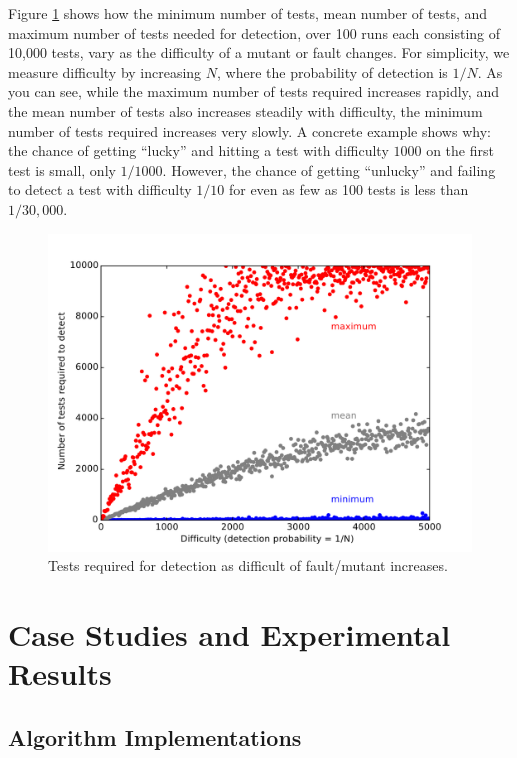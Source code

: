 \documentclass{svjour3}
\begin{document}
Figure \ref{fig:probmodel} shows how the minimum number of tests, mean
number of tests, and maximum number of tests needed for detection,
over 100 runs each consisting of 10,000 tests, vary as the difficulty
of a mutant or fault changes.  For simplicity, we measure difficulty
by increasing $N$, where the probability of detection is $1/N$.  As
you can see, while the maximum number of tests required increases
rapidly, and the mean number of tests also increases steadily with
difficulty, the minimum number of tests required increases very
slowly.  A concrete example shows why: the chance of getting ``lucky'' and hitting a test with
difficulty $1000$ on the first test is small, only $1/1000$.  However, the
chance of getting ``unlucky'' and failing to detect a test with
difficulty $1/10$ for even as few as 100 tests is less than $1/30,000$.

\begin{figure}
\includegraphics[width=\columnwidth]{probsmodel}
\caption{Tests required for detection as difficult of fault/mutant increases.}
\label{fig:probmodel}
\end{figure}

\section{Case Studies and Experimental Results}

\subsection{Algorithm Implementations}
\end{document}
